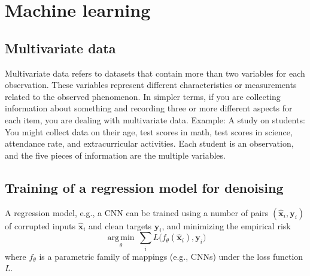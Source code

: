\chapter{Machine learning}

\section{Multivariate data}

Multivariate data refers to datasets that contain more than two
variables for each observation. These variables represent different
characteristics or measurements related to the observed phenomenon. In
simpler terms, if you are collecting information about something and
recording three or more different aspects for each item, you are
dealing with multivariate data. Example: A study on students: You
might collect data on their age, test scores in math, test scores in
science, attendance rate, and extracurricular activities. Each student
is an observation, and the five pieces of information are the multiple
variables.


\section{Training of a regression model for denoising} %
A regression model, e.g., a \gls{CNN} can be trained using a number of pairs $(\hat{{\mathbf x}}_i, {\mathbf y}_i)$ of corrupted inputs $\hat{{\mathbf x}}_i$ and clean targets ${\mathbf y}_i$, and minimizing the empirical risk
\begin{equation}
  \underset{\theta}{\operatorname{arg\,min}} \, \sum_i L \big(f_\theta(\hat{\mathbf x}_i), {\mathbf y}_i\big)
\end{equation}
where $f_\theta$ is a parametric family of mappings (e.g., CNNs) under the loss function $L$.


